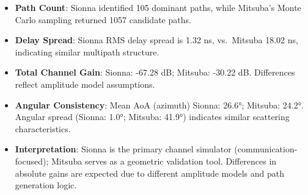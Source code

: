 \begin{itemize}
  \item \textbf{Path Count}: Sionna identified 105 dominant paths, 
  while Mitsuba's Monte Carlo sampling returned 1057 candidate paths.

  \item \textbf{Delay Spread}: Sionna RMS delay spread is 1.32 ns, 
  vs.\ Mitsuba 18.02 ns, indicating similar multipath structure.

  \item \textbf{Total Channel Gain}: Sionna: -67.28 dB; 
  Mitsuba: -30.22 dB. Differences reflect amplitude model assumptions.

  \item \textbf{Angular Consistency}: Mean AoA (azimuth) Sionna: 26.6°; 
  Mitsuba: 24.2°. Angular spread (Sionna: 1.0°; 
  Mitsuba: 41.9°) indicates similar scattering characteristics.

  \item \textbf{Interpretation}: Sionna is the primary channel simulator (communication-focused); 
  Mitsuba serves as a geometric validation tool. Differences in absolute gains are expected 
  due to different amplitude models and path generation logic.
\end{itemize}

